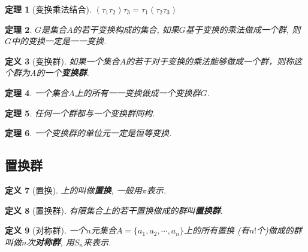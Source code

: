 \documentclass[UTF8]{ctexart}
\newtheorem{Definition}{定义}%
\newtheorem{Theorem}[Definition]{定理}
\begin{document}
\begin{Theorem}[变换乘法结合]
$(\tau_1 \tau_2) \tau_3 = \tau_1 ( \tau_2 \tau_3 )$
\end{Theorem}

\begin{Theorem}
$G$是集合$A$的若干变换构成的集合, 如果$G$基于变换的乘法做成一个群,
则$G$中的变换一定是一一变换.
\end{Theorem}

\begin{Definition}[变换群]
如果一个集合$A$的若干\;\;对于变换的乘法能够做成一个群，则称这个群为A的一个\textbf{变换群}.
\end{Definition}

\begin{Theorem}
一个集合$A$上的所有一一变换做成一个变换群$G$.
\end{Theorem}

\begin{Theorem}
任何一个群都与一个变换群同构.
\end{Theorem}

\begin{Theorem}
一个变换群的单位元一定是恒等变换.
\end{Theorem}

\subsection{置换群}

\begin{Definition}[置换]
\;上的\;\;叫做\textbf{置换}, 一般用$\pi$表示.
\end{Definition}

\begin{Definition}[置换群]
有限集合上的若干置换做成的群叫\textbf{置换群}.
\end{Definition}

\begin{Definition}[对称群]
一个$n$元集合$A = \{ a_1, a_2, \cdots, a_n \}$上的所有置换
(有$n!$个)做成的群叫做$n$次\textbf{对称群}, 用$S_n$来表示.
\end{Definition}
\end{document}
